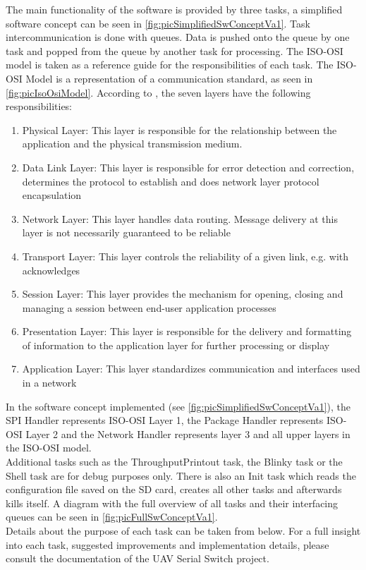 The main functionality of the software is provided by three tasks, a simplified software concept can be seen in \autoref{fig:picSimplifiedSwConceptVa1}. Task intercommunication is done with queues. Data is pushed onto the queue by one task and popped from the queue by another task for processing. The ISO-OSI model is taken as a reference guide for the responsibilities of each task. The ISO-OSI Model is a representation of a communication standard, as seen in \autoref{fig:picIsoOsiModel}. According to \cite{IsoOsiModel_Wikipedia}, the seven layers have the following responsibilities:\begin{enumerate}
    \item Physical Layer: This layer is responsible for the relationship between the application and the physical transmission medium.
    \item Data Link Layer: This layer is responsible for error detection and correction, determines the protocol to establish and does network layer protocol encapsulation
    \item Network Layer: This layer handles data routing. Message delivery at this layer is not necessarily guaranteed to be reliable
    \item Transport Layer: This layer controls the reliability of a given link, e.g. with acknowledges
    \item Session Layer: This layer provides the mechanism for opening, closing and managing a session between end-user application processes
    \item Presentation Layer: This layer is responsible for the delivery and formatting of information to the application layer for further processing or display
    \item Application Layer: This layer standardizes communication and interfaces used in a network
\end{enumerate}
In the software concept implemented (see \autoref{fig:picSimplifiedSwConceptVa1}), the SPI Handler represents ISO-OSI Layer 1, the Package Handler represents ISO-OSI Layer 2 and the Network Handler represents layer 3 and all upper layers in the ISO-OSI model.\\
Additional tasks such as the ThroughputPrintout task, the Blinky task or the Shell task are for debug purposes only. There is also an Init task which reads the configuration file saved on the SD card, creates all other tasks and afterwards kills itself. A diagram with the full overview of all tasks and their interfacing queues can be seen in \autoref{fig:picFullSwConceptVa1}.\\
Details about the purpose of each task can be taken from below. For a full insight into each task, suggested improvements and implementation details, please consult the documentation of the UAV Serial Switch project.
%
